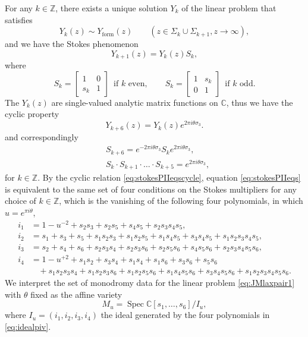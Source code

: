 \documentclass[a4paper,reqno]{amsart}
\numberwithin{equation}{section}
\newcommand{\C}{\mathbb{C}}
\numberwithin{equation}{section}
\begin{document}
For any $k\in\mathbb{Z}$, there exists a unique solution $Y_k$ of the linear problem that satisfies
\begin{equation*}
    Y_k(z)\sim Y_\text{form}(z)\qquad (z\in \Sigma_k\cup \Sigma_{k+1}, z\rightarrow \infty),
\end{equation*}
and we have the Stokes phenomenon
\begin{equation*}
    Y_{k+1}(z)=Y_k(z)S_k,
\end{equation*}
where
\begin{equation*}
    S_k=\begin{bmatrix}
        1 & 0\\
        s_k & 1
    \end{bmatrix}\,\,\, \text{if $k$ even},\qquad
    S_k=\begin{bmatrix}
        1 & s_k\\
        0 & 1
    \end{bmatrix}\,\,\, \text{if $k$ odd}.
\end{equation*}
The $Y_k(z)$ are single-valued analytic matrix functions on $\mathbb{C}$, thus we have the cyclic property
\begin{equation*}
    Y_{k+6}(z)=Y_k(z)e^{2\pi i \theta \sigma_3}.
\end{equation*}
and correspondingly
\begin{align}
    &S_{k+6}=e^{-2\pi i \theta \sigma_3}S_k e^{2\pi i \theta \sigma_3},\label{eq:stokesPIIeqscycle}\\ 
    &S_k\cdot S_{k+1}\cdot\ldots\cdot S_{k+5}=e^{2\pi i \theta\sigma_3},\label{eq:stokesPIIeqs}
\end{align}
for $k\in\mathbb{Z}$. By the cyclic relation \eqref{eq:stokesPIIeqscycle}, equation \eqref{eq:stokesPIIeqs} is equivalent to the same set of four conditions on the Stokes multipliers for any choice of $k\in\mathbb{Z}$, which is the vanishing of the following four polynomials, in which 
$u=e^{\pi i \theta}$,
\begin{equation} \label{eq:idealpiv}
    \begin{aligned}
        i_1 &= 1-u^{-2}+ s_2 s_3+s_2 s_5+s_4 s_5+s_2 s_3 s_4 s_5 ,\\
        i_2 &= s_1+s_3+s_5 + s_1 s_2 s_3 +s_1 s_2 s_5 +s_1  s_4 s_5 +s_3 s_4 s_5   +s_1 s_2 s_3 s_4 s_5 ,\\
        i_3 &= s_2+s_4+s_6+ s_2 s_3 s_4 +s_2 s_3 s_6  +s_2 s_5 s_6 +s_4 s_5 s_6  +s_2 s_3 s_4 s_5 s_6, \\
        i_4 &= 1-u^{+2} +s_1 s_2+s_3 s_4 +s_1 s_4+s_1 s_6+s_3 s_6 +s_5 s_6\\
        & \;\;\,\,+s_1 s_2 s_3 s_4+s_1 s_2 s_3 s_6+s_1 s_2 s_5 s_6+s_1 s_4 s_5 s_6+s_3 s_4 s_5 s_6+s_1 s_2 s_3 s_4 s_5 s_6.
    \end{aligned}
\end{equation}
 We interpret the set of monodromy data for the linear problem \eqref{eq:JMlaxpair1} with $\theta$ fixed as the affine variety 
\begin{equation}\label{eq:monodromyspaceMPII} 
    M_u = \operatorname{Spec} \C [s_1,\dots,s_6]/I_u,
\end{equation}
where $I_u = (i_1,i_2,i_3,i_4)$ the ideal generated by the four polynomials in \eqref{eq:idealpiv}.
\end{document}
